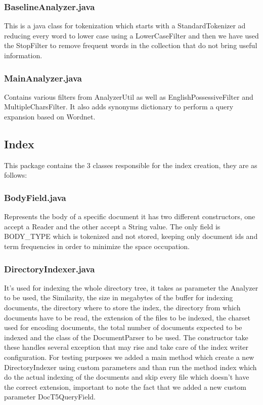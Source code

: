 \subsubsection{BaselineAnalyzer.java}
            
            This is a java class for tokenization which starts with a StandardTokenizer ad reducing every word to lower case using a LowerCaseFilter and then we have used the StopFilter to remove frequent words in the collection that do not bring useful information. 
\subsubsection{MainAnalyzer.java}
            
            Contains various filters from AnalyzerUtil as well as EnglishPossessiveFilter and MultipleCharsFilter. It also adds synonyms dictionary to perform a query expansion based on Wordnet.
\subsection{Index}
  
     This package contains the 3 classes responsible for the index creation, they are as follows: 
     
\subsubsection{BodyField.java}
    
        Represents the body of a specific document it has two different constructors, one accept a Reader and the other accept a String value. The only field is BODY\_TYPE  which is tokenized and not stored, keeping only document ids and term frequencies in order to minimize the space occupation. 
\subsubsection{DirectoryIndexer.java}
    
        It's used for indexing the whole directory tree, it takes as parameter the Analyzer to be used, the Similarity, the size in megabytes of the buffer for indexing documents, the directory where to store the index, the directory from which documents have to be read, the extension of the files to be indexed, the charset used for encoding documents, the total number of documents expected to be indexed and the class of the DocumentParser to be used. The constructor take these handles several exception that may rise and take care of the index writer configuration. For testing purposes we added a main method which create a new DirectoryIndexer using custom parameters and than run the method index which do the actual indexing of the documents and skip every file which doesn't have the correct extension, important to note the fact that we added a new custom parameter DocT5QueryField. 
